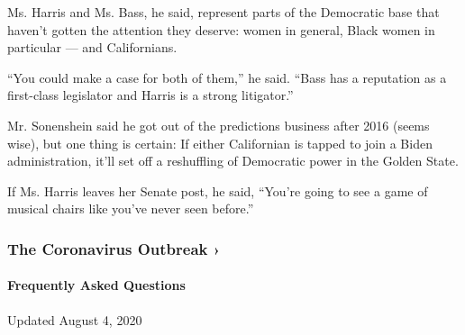 Ms. Harris and Ms. Bass, he said, represent parts of the Democratic base
that haven't gotten the attention they deserve: women in general, Black
women in particular --- and Californians.

``You could make a case for both of them,'' he said. ``Bass has a
reputation as a first-class legislator and Harris is a strong
litigator.''

Mr. Sonenshein said he got out of the predictions business after 2016
(seems wise), but one thing is certain: If either Californian is tapped
to join a Biden administration, it'll set off a reshuffling of
Democratic power in the Golden State.

If Ms. Harris leaves her Senate post, he said, ``You're going to see a
game of musical chairs like you've never seen before.''

\href{https://www.nytimes.com/news-event/coronavirus?action=click\&pgtype=Article\&state=default\&region=MAIN_CONTENT_3\&context=storylines_faq}{}

\hypertarget{the-coronavirus-outbreak-}{%
\subsubsection{The Coronavirus Outbreak
›}\label{the-coronavirus-outbreak-}}

\hypertarget{frequently-asked-questions}{%
\paragraph{Frequently Asked
Questions}\label{frequently-asked-questions}}

Updated August 4, 2020

